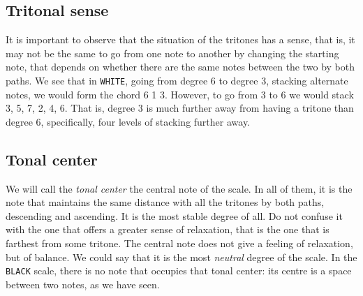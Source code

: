 \documentclass[]{report}
\begin{document}
\subsection{Tritonal sense}
It is important to observe that the situation of the tritones has a sense, that is, it may not be the same to go from one note to another by changing the starting note, that depends on whether there are the same notes between the two by both paths. We see that in \texttt{WHITE}, going from degree 6 to degree 3, stacking alternate notes, we would form the chord 6 1 3. However, to go from 3 to 6 we would stack 3, 5, 7, 2, 4, 6. That is, degree 3 is much further away from having a tritone than degree 6, specifically, four levels of stacking further away.
\subsection{Tonal center}
We will call the \emph{tonal center} the central note of the scale. In all of them, it is the note that maintains the same distance with all the tritones by both paths, descending and ascending. It is the most stable degree of all. Do not confuse it with the one that offers a greater sense of relaxation, that is the one that is farthest from some tritone. The central note does not give a feeling of relaxation, but of balance. We could say that it is the most \emph{neutral} degree of the scale. In the \texttt{BLACK} scale, there is no note that occupies that tonal center: its centre is a space between two notes, as we have seen.
\end{document}
